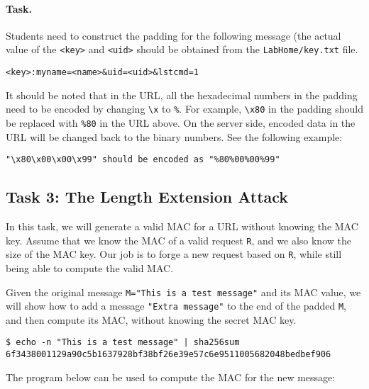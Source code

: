 \paragraph{Task.} Students need to construct the padding for the following
message (the actual value of the \texttt{<key>} and \texttt{<uid>} should
be obtained from the \texttt{LabHome/key.txt} file.

\begin{lstlisting}
<key>:myname=<name>&uid=<uid>&lstcmd=1
\end{lstlisting}


It should be noted that in the URL,
all the hexadecimal numbers in the padding
need to be encoded by changing
\texttt{\textbackslash x} to \texttt{\%}. For example,
\texttt{\textbackslash x80} in the padding should be
replaced with \texttt{\%80} in the URL above.
On the server side, encoded data in the URL
will be changed back to the binary numbers.
See the following example: 

\begin{lstlisting}
"\x80\x00\x00\x99" should be encoded as "%80%00%00%99"
\end{lstlisting}

\subsection{Task 3: The Length Extension Attack}

In this task, we will generate a valid MAC for a URL without
knowing the MAC key.  Assume that we know the MAC of a valid
request \texttt{R}, and we also know the size of the MAC key.
Our job is to forge a new request based on \texttt{R},
while still being able to compute the valid MAC.

Given the original message \texttt{M="This is a test message"} and its
MAC value, we will show how to add a message
\texttt{"Extra message"} to the end of the padded \texttt{M}, and
then compute its MAC, without knowing the secret MAC key.

\begin{lstlisting}
$ echo -n "This is a test message" | sha256sum
6f3438001129a90c5b1637928bf38bf26e39e57c6e9511005682048bedbef906
\end{lstlisting}

The program below can be used to compute the MAC for the
new message:

